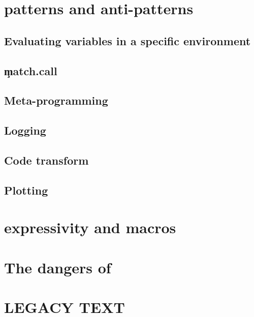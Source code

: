 \documentclass[screen,acmsmall]{acmart}
\begin{document}
\section{\eval patterns and anti-patterns}


\subsection{Evaluating variables in a specific environment}

\subsection{\c{match.call}}

\subsection{Meta-programming}

\subsection{Logging}

\subsection{Code transform}

\subsection{Plotting}

\section{\eval expressivity and macros}


\section{The dangers of \eval} \label{sec:dangerseval}

\section{LEGACY TEXT}
\end{document}
